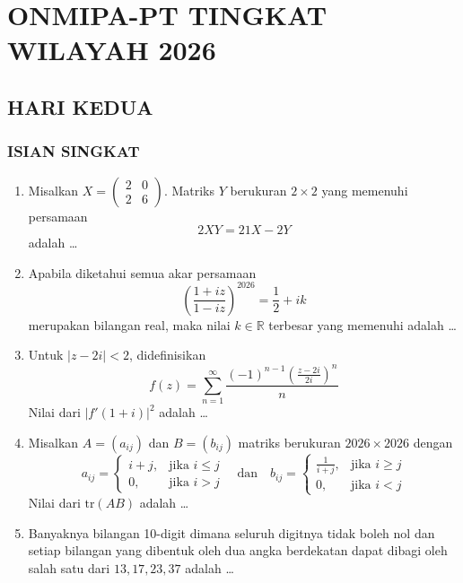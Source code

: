 \documentclass[12pt,twoside]{article}
\begin{document}
\newpage
{}
\section{ONMIPA-PT TINGKAT WILAYAH 2026}
\subsection{HARI KEDUA}

\subsubsection*{ISIAN SINGKAT}
\begin{enumerate}
	\item Misalkan $X = \begin{pmatrix} 2 & 0 \\ 2 & 6 \end{pmatrix}$. Matriks $Y$ berukuran $2 \times 2$ yang memenuhi persamaan
	      \[2XY = 21X - 2Y\]
	      adalah \dots

	\item Apabila diketahui semua akar persamaan
	      \[\left(\frac{1+iz}{1-iz}\right)^{2026} = \frac{1}{2} + ik\]
	      merupakan bilangan real, maka nilai $k \in \mathbb{R}$ terbesar yang memenuhi adalah \dots

	\item Untuk $|z-2i| < 2$, didefinisikan
	      \[f(z) = \sum_{n=1}^{\infty} \frac{(-1)^{n-1} \left(\frac{z-2i}{2i}\right)^n}{n}\]
	      Nilai dari $|f'(1+i)|^2$ adalah \dots

	\item Misalkan $A = (a_{ij})$ dan $B = (b_{ij})$ matriks berukuran $2026 \times 2026$ dengan
	      \[a_{ij} = \begin{cases} i+j, & \text{jika } i \leq j \\ 0, & \text{jika } i > j \end{cases} \quad \text{dan} \quad b_{ij} = \begin{cases} \frac{1}{i+j}, & \text{jika } i \geq j \\ 0, & \text{jika } i < j \end{cases}\]
	      Nilai dari $\text{tr}(AB)$ adalah \dots

	\item Banyaknya bilangan 10-digit dimana seluruh digitnya tidak boleh nol dan setiap bilangan yang dibentuk oleh dua angka berdekatan dapat dibagi oleh salah satu dari $13, 17, 23, 37$ adalah \dots
\end{enumerate}
\end{document}

